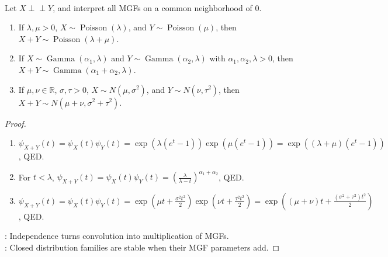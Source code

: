 \begin{corollary} \label{cor:mgf-independent-sum-families} \\
Let $X\perp\!\!\!\perp Y$, and interpret all MGFs on a common neighborhood of $0$.
\begin{enumerate}[label=(\roman*)]
\setlength{\itemsep}{0pt}
\item If $\lambda,\mu>0$, $X\sim\operatorname{Poisson}(\lambda)$, and $Y\sim\operatorname{Poisson}(\mu)$, then $X+Y\sim\operatorname{Poisson}(\lambda+\mu)$.
\item If $X\sim\operatorname{Gamma}(\alpha_1,\lambda)$ and $Y\sim\operatorname{Gamma}(\alpha_2,\lambda)$ with $\alpha_1,\alpha_2,\lambda>0$, then $X+Y\sim\operatorname{Gamma}(\alpha_1+\alpha_2,\lambda)$.
\item If $\mu,\nu\in\mathbb{R}$, $\sigma,\tau>0$, $X\sim N(\mu,\sigma^2)$, and $Y\sim N(\nu,\tau^2)$, then $X+Y\sim N(\mu+\nu,\sigma^2+\tau^2)$.
\end{enumerate}
\begin{proof}
\begin{enumerate}[label=(\roman*)]
\setlength{\itemsep}{0pt}
\item $\psi_{X+Y}(t)=\psi_X(t)\psi_Y(t)=\exp(\lambda(e^t-1))\exp(\mu(e^t-1))=\exp((\lambda+\mu)(e^t-1))$, QED.
\item For $t<\lambda$, $\psi_{X+Y}(t)=\psi_X(t)\psi_Y(t)=(\frac{\lambda}{\lambda-t})^{\alpha_1+\alpha_2}$, QED.
\item $\psi_{X+Y}(t)=\psi_X(t)\psi_Y(t)=\exp(\mu t+\frac{\sigma^2t^2}{2})\exp(\nu t+\frac{\tau^2t^2}{2})=\exp((\mu+\nu)t+\frac{(\sigma^2+\tau^2)t^2}{2})$, QED.
\end{enumerate}
: Independence turns convolution into multiplication of MGFs.\\
: Closed distribution families are stable when their MGF parameters add.
\end{proof}
\end{corollary}


